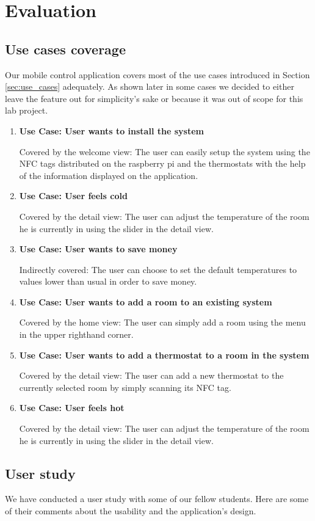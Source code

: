 \section{Evaluation}

\subsection {Use cases coverage}
Our mobile control application covers most of the use cases introduced in Section \ref{sec:use_cases} adequately. As shown later in some cases we decided to either leave the feature out for simplicity's sake or because it was out of scope for this lab project.

\begin{enumerate}
\item \textbf{Use Case: User wants to install the system}

Covered by the welcome view: The user can easily setup the system using the NFC tags distributed on the raspberry pi and the thermostats with the help of the information displayed on the application.
\item \textbf{Use Case: User feels cold}

Covered by the detail view: The user can adjust the temperature of the room he is currently in using the slider in the detail view.
\item \textbf{Use Case: User wants to save money}

Indirectly covered: The user can choose to set the default temperatures to values lower than usual in order to save money.
\item \textbf{Use Case: User wants to add a room to an existing system}

Covered by the home view: The user can simply add a room using the menu in the upper righthand corner.
\item \textbf{Use Case: User wants to add a thermostat to a room in the system}

Covered by the detail view: The user can add a new thermostat to the currently selected room by simply scanning its NFC tag.
\item \textbf{Use Case: User feels hot}

Covered by the detail view: The user can adjust the temperature of the room he is currently in using the slider in the detail view.
\end{enumerate}

\subsection{User study}
We have conducted a user study with some of our fellow students. Here are some of their comments about the usability and the application's design.

